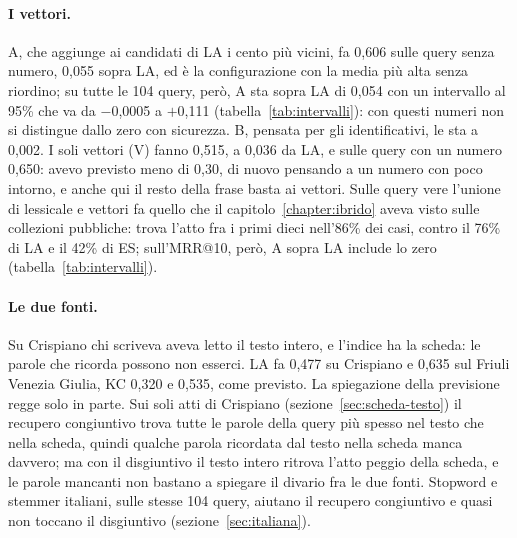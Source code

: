 \paragraph{I vettori.} A, che aggiunge ai candidati di LA i cento più vicini,
fa 0,606 sulle query senza numero, 0,055 sopra LA, ed è la configurazione con la
media più alta senza riordino; su tutte le 104 query, però, A sta sopra LA di
0,054 con un intervallo al 95\% che va da $-$0,0005 a $+$0,111
(tabella~\ref{tab:intervalli}): con questi numeri non si distingue dallo zero con
sicurezza. B, pensata per gli identificativi, le sta a 0,002. I soli vettori (V)
fanno 0,515, a 0,036 da LA, e sulle query con un numero 0,650: avevo previsto
meno di 0,30, di nuovo pensando a un numero con poco intorno, e anche qui il
resto della frase basta ai vettori. Sulle query vere l'unione di lessicale e
vettori fa quello che il capitolo~\ref{chapter:ibrido} aveva visto sulle
collezioni pubbliche: trova l'atto fra i primi dieci nell'86\% dei casi, contro
il 76\% di LA e il 42\% di ES; sull'MRR@10, però, A sopra LA include lo zero
(tabella~\ref{tab:intervalli}).

\paragraph{Le due fonti.} Su Crispiano chi scriveva aveva letto il testo
intero, e l'indice ha la scheda: le parole che ricorda possono non esserci. LA
fa 0,477 su Crispiano e 0,635 sul Friuli Venezia Giulia, KC 0,320 e 0,535,
come previsto. La spiegazione della previsione regge solo in parte. Sui soli
atti di Crispiano (sezione~\ref{sec:scheda-testo}) il recupero congiuntivo
trova tutte le parole della query più spesso nel testo che nella scheda, quindi
qualche parola ricordata dal testo nella scheda manca davvero; ma con il
disgiuntivo il testo intero ritrova l'atto peggio della scheda, e le parole
mancanti non bastano a spiegare il divario fra le due fonti. Stopword e stemmer italiani, sulle stesse 104 query, aiutano il
recupero congiuntivo e quasi non toccano il disgiuntivo
(sezione~\ref{sec:italiana}).


